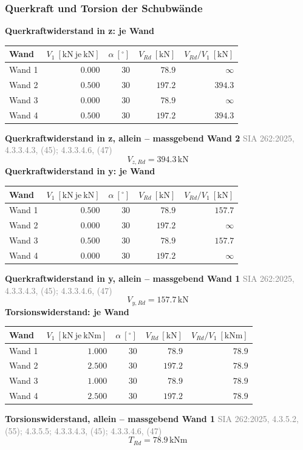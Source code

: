 \documentclass[11pt,a4paper]{article}
\newcommand{\normref}[1]{{\small\textcolor{gray}{#1}}}
\begin{document}
\subsubsection{Querkraft und Torsion der Schubwände}
\noindent\textbf{Querkraftwiderstand in z: je Wand}
\begin{longtable}{lrrrr}
\hline
Wand & $V_1\ [\mathrm{kN}\ \text{je}\ \mathrm{kN}]$ & $\alpha\ [{}^{\circ}]$ & $V_{Rd}\ [\mathrm{kN}]$ & $V_{Rd}/V_1\ [\mathrm{kN}]$ \\
\hline
\endhead
Wand 1 & $0.000$ & $30$ & $78.9$ & $\infty$ \\
Wand 2 & $0.500$ & $30$ & $197.2$ & $394.3$ \\
Wand 3 & $0.000$ & $30$ & $78.9$ & $\infty$ \\
Wand 4 & $0.500$ & $30$ & $197.2$ & $394.3$ \\
\hline
\end{longtable}
\noindent\textbf{Querkraftwiderstand in z, allein – massgebend Wand 2} \hfill \normref{SIA 262:2025, 4.3.3.4.3, (45); 4.3.3.4.6, (47)}
\begin{equation*}
V_{z,Rd} = 394.3\,\mathrm{kN}
\end{equation*}
\noindent\textbf{Querkraftwiderstand in y: je Wand}
\begin{longtable}{lrrrr}
\hline
Wand & $V_1\ [\mathrm{kN}\ \text{je}\ \mathrm{kN}]$ & $\alpha\ [{}^{\circ}]$ & $V_{Rd}\ [\mathrm{kN}]$ & $V_{Rd}/V_1\ [\mathrm{kN}]$ \\
\hline
\endhead
Wand 1 & $0.500$ & $30$ & $78.9$ & $157.7$ \\
Wand 2 & $0.000$ & $30$ & $197.2$ & $\infty$ \\
Wand 3 & $0.500$ & $30$ & $78.9$ & $157.7$ \\
Wand 4 & $0.000$ & $30$ & $197.2$ & $\infty$ \\
\hline
\end{longtable}
\noindent\textbf{Querkraftwiderstand in y, allein – massgebend Wand 1} \hfill \normref{SIA 262:2025, 4.3.3.4.3, (45); 4.3.3.4.6, (47)}
\begin{equation*}
V_{y,Rd} = 157.7\,\mathrm{kN}
\end{equation*}
\noindent\textbf{Torsionswiderstand: je Wand}
\begin{longtable}{lrrrr}
\hline
Wand & $V_1\ [\mathrm{kN}\ \text{je}\ \mathrm{kNm}]$ & $\alpha\ [{}^{\circ}]$ & $V_{Rd}\ [\mathrm{kN}]$ & $V_{Rd}/V_1\ [\mathrm{kNm}]$ \\
\hline
\endhead
Wand 1 & $1.000$ & $30$ & $78.9$ & $78.9$ \\
Wand 2 & $2.500$ & $30$ & $197.2$ & $78.9$ \\
Wand 3 & $1.000$ & $30$ & $78.9$ & $78.9$ \\
Wand 4 & $2.500$ & $30$ & $197.2$ & $78.9$ \\
\hline
\end{longtable}
\noindent\textbf{Torsionswiderstand, allein – massgebend Wand 1} \hfill \normref{SIA 262:2025, 4.3.5.2, (55); 4.3.5.5; 4.3.3.4.3, (45); 4.3.3.4.6, (47)}
\begin{equation*}
T_{Rd} = 78.9\,\mathrm{kNm}
\end{equation*}
\end{document}
